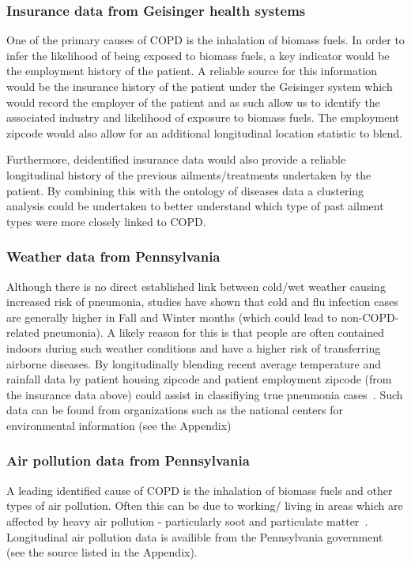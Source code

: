 \documentclass{article}
\begin{document}
\subsubsection{Insurance data from Geisinger health systems}

\noindent One of the primary causes of COPD is the inhalation of biomass fuels. In order to infer the likelihood of being exposed to biomass fuels, a key indicator would be the employment history of the patient. A reliable source for this information would be the insurance history of the patient under the Geisinger system which would record the employer of the patient and as such allow us to identify the associated industry and likelihood of exposure to biomass fuels. The employment zipcode would also allow for an additional longitudinal location statistic to blend.

Furthermore, deidentified insurance data would also provide a reliable longitudinal history of the previous ailments/treatments undertaken by the patient. By combining this with the ontology of diseases data a clustering analysis could be undertaken to better understand which type of past ailment types were more closely linked to COPD.


\subsubsection{Weather data from Pennsylvania}
Although there is no direct established link between cold/wet weather causing increased risk of pneumonia, studies have shown that cold and flu infection cases are generally higher in Fall and Winter months (which could lead to non-COPD-related pneumonia). A likely reason for this is that people are often contained indoors during such weather conditions and have a higher risk of transferring airborne diseases. By longitudinally  blending recent average temperature and rainfall data by patient housing zipcode and patient employment zipcode (from the insurance 
data above) could assist in classifiying true pneumonia cases~\cite{mccoy_health_2008}. Such data can be found from organizations such as the national centers for environmental information (see the Appendix)

\subsubsection{Air pollution data from Pennsylvania}
A leading identified cause of COPD is the inhalation of biomass fuels and other types of air pollution. Often this can be due to working/ living in areas which are affected by heavy air pollution - particularly soot and particulate matter~\cite{who_who_2014}. Longitudinal air pollution data is availible from the Pennsylvania government (see the source listed in the Appendix).
\end{document}
